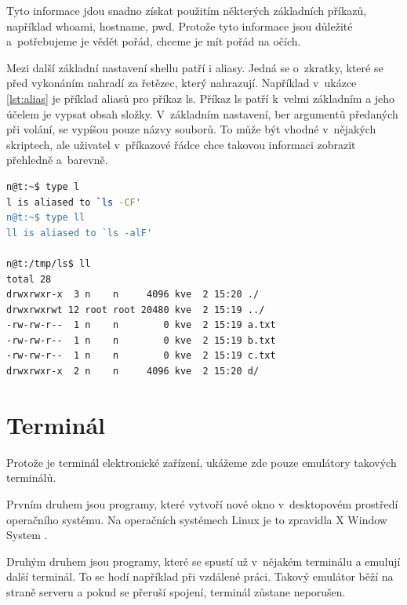 \documentclass[thesis=M,czech]{FITthesis}[2012/06/26]
\begin{document}
Tyto informace jdou snadno získat použitím některých základních příkazů, například whoami, hostname, pwd. Protože tyto informace jsou důležité a~potřebujeme je vědět pořád, chceme je mít pořád na očích.

Mezi další základní nastavení shellu patří i aliasy. Jedná se o~zkratky, které se před vykonáním nahradí za řetězec, který nahrazují. Například v~ukázce \ref{lst:alias} je příklad aliasů pro příkaz ls. Příkaz ls patří k~velmi základním a jeho účelem je vypsat obsah složky. V~základním nastavení, ber argumentů předaných při volání, se vypíšou pouze názvy souborů. To může být vhodné v~nějakých skriptech, ale uživatel v~příkazové řádce chce takovou informaci zobrazit přehledně a~barevně.

\begin{minipage}{\linewidth}
\begin{lstlisting}[language=bash, caption={Příklad použití aliasu v~Bashi}, label={lst:alias}]
n@t:~$ type l
l is aliased to `ls -CF'
n@t:~$ type ll
ll is aliased to `ls -alF'

n@t:/tmp/ls$ ll
total 28
drwxrwxr-x  3 n    n     4096 kve  2 15:20 ./
drwxrwxrwt 12 root root 20480 kve  2 15:19 ../
-rw-rw-r--  1 n    n        0 kve  2 15:19 a.txt
-rw-rw-r--  1 n    n        0 kve  2 15:19 b.txt
-rw-rw-r--  1 n    n        0 kve  2 15:19 c.txt
drwxrwxr-x  2 n    n     4096 kve  2 15:20 d/
\end{lstlisting}
\end{minipage}

%
%
%
\section{Terminál}


Protože je terminál elektronické zařízení, ukážeme zde pouze emulátory takových terminálů.

Prvním druhem jsou programy, které vytvoří nové okno v~desktopovém prostředí operačního systému. Na operačních systémech Linux je to zpravidla X Window System \cite{xorg}.

Druhým druhem jsou programy, které se spustí už v~nějakém terminálu a emulují další terminál. To se hodí například při vzdálené práci. Takový emulátor běží na straně serveru a pokud se přeruší spojení, terminál zůstane neporušen.
\end{document}
